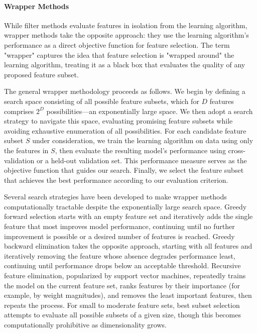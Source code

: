\paragraph{Wrapper Methods}

While filter methods evaluate features in isolation from the learning algorithm, wrapper methods take the opposite approach: they use the learning algorithm's performance as a direct objective function for feature selection. The term "wrapper" captures the idea that feature selection is "wrapped around" the learning algorithm, treating it as a black box that evaluates the quality of any proposed feature subset.

The general wrapper methodology proceeds as follows. We begin by defining a search space consisting of all possible feature subsets, which for $D$ features comprises $2^D$ possibilities—an exponentially large space. We then adopt a search strategy to navigate this space, evaluating promising feature subsets while avoiding exhaustive enumeration of all possibilities. For each candidate feature subset $S$ under consideration, we train the learning algorithm on data using only the features in $S$, then evaluate the resulting model's performance using cross-validation or a held-out validation set. This performance measure serves as the objective function that guides our search. Finally, we select the feature subset that achieves the best performance according to our evaluation criterion.

Several search strategies have been developed to make wrapper methods computationally tractable despite the exponentially large search space. Greedy forward selection starts with an empty feature set and iteratively adds the single feature that most improves model performance, continuing until no further improvement is possible or a desired number of features is reached. Greedy backward elimination takes the opposite approach, starting with all features and iteratively removing the feature whose absence degrades performance least, continuing until performance drops below an acceptable threshold. Recursive feature elimination, popularized by support vector machines, repeatedly trains the model on the current feature set, ranks features by their importance (for example, by weight magnitudes), and removes the least important features, then repeats the process. For small to moderate feature sets, best subset selection attempts to evaluate all possible subsets of a given size, though this becomes computationally prohibitive as dimensionality grows.

